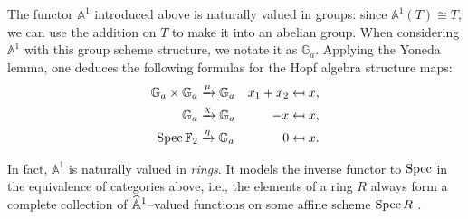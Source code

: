 \begin{example}\label{InformalAdditiveGroupExample}
The functor $\mathbb A^1$ introduced above is naturally valued in groups: since $\mathbb A^1(T) \cong T$, we can use the addition on $T$ to make it into an abelian group.  When considering $\mathbb A^1$ with this group scheme structure, we notate it as $\mathbb G_a$.  Applying the Yoneda lemma, one deduces the following formulas for the Hopf algebra structure maps:
\begin{align*}
\mathbb G_a \times \mathbb G_a & \xrightarrow{\mu} \mathbb G_a & x_1 + x_2 & \mapsfrom x, \\
\mathbb G_a & \xrightarrow{\chi} \mathbb G_a & -x & \mapsfrom x, \\
\operatorname{Spec} \mathbb F_2 & \xrightarrow{\eta} \mathbb G_a & 0 & \mapsfrom x.
\end{align*}
\end{example}

\begin{remark}
In fact, $\mathbb A^1$ is naturally valued in \emph{rings}. It models the inverse functor to $\operatorname{Spec}$ in the equivalence of categories above, i.e., the elements of a ring $R$ always form a complete collection of $\widehat{\mathbb{A}}^1$--valued functions on some affine scheme $\operatorname{Spec} R$ .
\end{remark}

